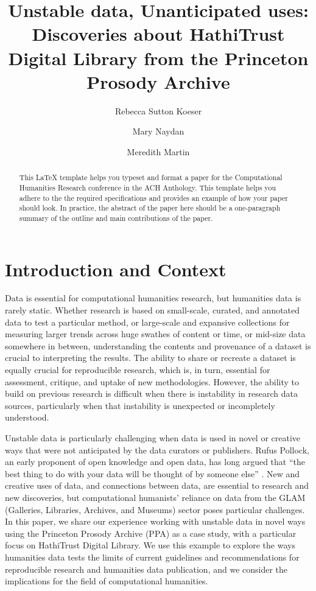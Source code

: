 \documentclass{anthology-ch}         %
\title{Unstable data, Unanticipated uses: Discoveries about HathiTrust Digital Library from the Princeton Prosody Archive}
\author[1]{Rebecca Sutton Koeser}[
  orcid=0000-0002-8762-8057
]
\author[1]{Mary Naydan}[
  orcid=0000-0002-7960-3175
]
\author[1]{Meredith Martin}[
  orcid=0000-0003-0214-8757
]
\affiliation{1}{Center for Digital Humanities, Princeton University, Princeton, New Jersey, USA}
\begin{document}
\maketitle

\begin{abstract}
This LaTeX template helps you typeset and format a paper for the Computational Humanities Research conference in the ACH Anthology. 
This template helps you adhere to the the required specifications and provides an example of how your paper should look. In practice, the abstract of the paper here should be a one-paragraph summary of the outline and main contributions of the paper.  
\end{abstract}

\section{Introduction and Context}

Data is essential for computational humanities research, but humanities data is rarely static. Whether research is based on small-scale, curated, and annotated data to test a particular method, or large-scale and expansive collections for measuring larger trends across huge swathes of content or time, or mid-size data somewhere in between, understanding the contents and provenance of a dataset is crucial to interpreting the results. The ability to share or recreate a dataset is equally crucial for reproducible research, which is, in turn, essential for assessment, critique, and uptake of new methodologies. However, the ability to build on previous research is difficult when there is instability in research data sources, particularly when that instability is unexpected or incompletely understood. 

Unstable data is particularly challenging when data is used in novel or creative ways that were not anticipated by the data curators or publishers. Rufus Pollock, an early proponent of open knowledge and open data, has long argued that “the best thing to do with your data will be thought of by someone else”  \cite{pollock_open_2011}. New and creative uses of data, and connections between data, are essential to research and new discoveries, but computational humanists’ reliance on data from the GLAM (Galleries, Libraries, Archives, and Museums) sector poses particular challenges. In this paper, we share our experience working with unstable data in novel ways using the Princeton Prosody Archive (PPA) as a case study, with a particular focus on HathiTrust Digital Library. We use this example to explore the ways humanities data tests the limits of current guidelines and recommendations for reproducible research and humanities data publication, and we consider the implications for the field of computational humanities. 
\end{document}
